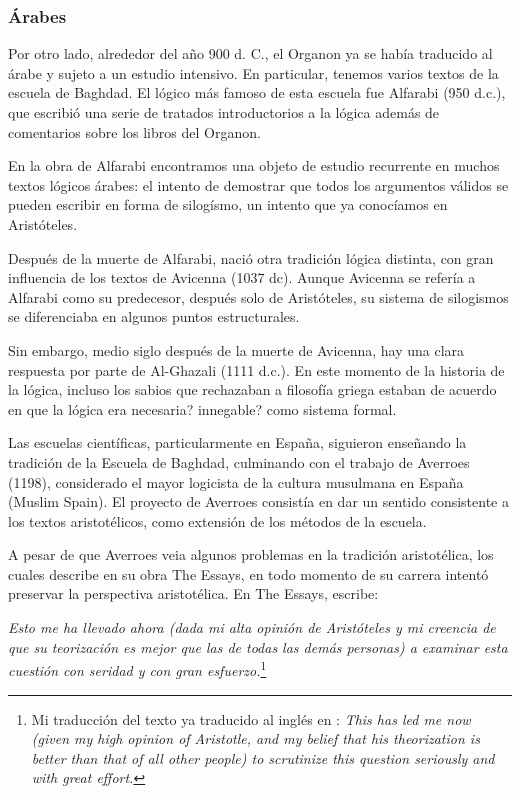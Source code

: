 \documentclass{article}
\begin{document}
\subsubsection{Árabes}

Por otro lado, alrededor del año 900 d. C., el Organon ya se había traducido al árabe y sujeto a un estudio intensivo. En particular, tenemos varios textos de la escuela de Baghdad. El lógico más famoso de esta escuela fue Alfarabi (950 d.c.), que escribió una serie de tratados introductorios a la lógica además de comentarios sobre los libros del Organon.

En la obra de Alfarabi encontramos una objeto de estudio recurrente en muchos textos lógicos árabes: el intento de demostrar que todos los argumentos válidos se pueden escribir en forma de silogísmo, un intento que ya conocíamos en Aristóteles.

Después de la muerte de Alfarabi, nació otra tradición lógica distinta, con gran influencia de los textos de Avicenna (1037 dc). Aunque Avicenna se refería a Alfarabi como su predecesor, después solo de Aristóteles, su sistema de silogismos se diferenciaba en algunos puntos estructurales.

Sin embargo, medio siglo después de la muerte de Avicenna, hay una clara respuesta por parte de Al-Ghazali (1111 d.c.). En este momento de la historia de la lógica, incluso los sabios que rechazaban a filosofía griega estaban de acuerdo en que la lógica era necesaria? innegable? como sistema formal.

Las escuelas científicas, particularmente en España, siguieron enseñando la tradición de la Escuela de Baghdad, culminando con el trabajo de Averroes (1198), considerado el mayor logicista de la cultura musulmana en España (Muslim Spain). El proyecto de Averroes consistía en dar un sentido consistente a los textos aristotélicos, como extensión de los métodos de la escuela.

A pesar de que Averroes veia algunos problemas en la tradición aristotélica, los cuales describe en su obra The Essays, en todo momento de su carrera intentó preservar la perspectiva aristotélica\cite{street2001arabic}. En The Essays, escribe:

\begin{displayquote}
     \textit{Esto me ha llevado ahora (dada mi alta opinión de Aristóteles y mi creencia de que su teorización es mejor que las de todas las demás personas) a examinar esta cuestión con seridad y con gran esfuerzo.}\footnote{Mi traducción del texto ya traducido al inglés en \cite{street2001arabic}: \textit{This has led me now
    (given my high opinion of Aristotle, and my belief that his theorization is better than that of all other people) to scrutinize this question seriously and
    with great effort.}}
\end{displayquote}
\end{document}
